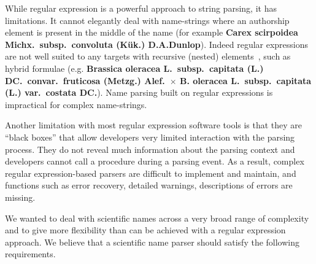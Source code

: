 \documentclass{bmcart}
\begin{document}
While regular expression is a powerful approach to string parsing, it has limitations. It cannot elegantly deal with name-strings where an authorship element is present in the middle of the name (for example \textbf{Carex scirpoidea Michx.\ subsp.\ convoluta (Kük.) D.A.Dunlop}). Indeed regular expressions are not well suited to any targets with recursive (nested) elements~\cite{yu1997handbook}, such as hybrid formulae (e.g. \textbf{Brassica oleracea L.\ subsp.\ capitata (L.) DC.\ convar.\ fruticosa (Metzg.) Alef.\ $\times$ B.  oleracea L.\ subsp.\ capitata (L.) var.\ costata DC.}). Name parsing built on regular expressions is impractical for complex name-strings.

Another limitation with most regular expression software tools is that they are ``black boxes'' that allow developers very limited interaction with the parsing process. They do not reveal much information about the parsing context and developers cannot call a procedure during a parsing event. As a result, complex regular expression-based parsers are difficult to implement and maintain, and functions such as error recovery, detailed warnings, descriptions of errors are missing.

We wanted to deal with scientific names across a very broad range of complexity and to give more flexibility than can be achieved with a regular expression approach. We believe that a scientific name parser should satisfy the following requirements.
\end{document}
